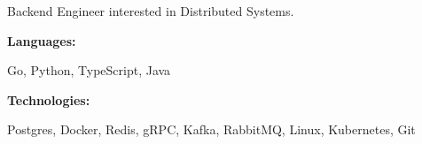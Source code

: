 \documentclass[9pt]{developercv} %
\begin{document}
\begin{minipage}[t]{0.46\textwidth}
	\vspace{-6pt}
	Backend Engineer interested in Distributed Systems.
	\vspace{-6pt}
\end{minipage}
\hfill %
\begin{minipage}[t]{0.465\textwidth}
	\vspace{-6pt}

	\begin{minipage}[t]{0.2\textwidth}
		\textbf{Languages:}
	\end{minipage}
	\hfill
	\begin{minipage}[t]{0.73\textwidth}
		Go, Python, TypeScript, Java
	\end{minipage}
	\vspace{4mm}

	\begin{minipage}[t]{0.2\textwidth}
		\textbf{Technologies:}
	\end{minipage}
	\hfill
	\begin{minipage}[t]{0.73\textwidth}
		Postgres, Docker, Redis, gRPC, Kafka, RabbitMQ, Linux, Kubernetes, Git
	\end{minipage}

\end{minipage}
\end{document}
